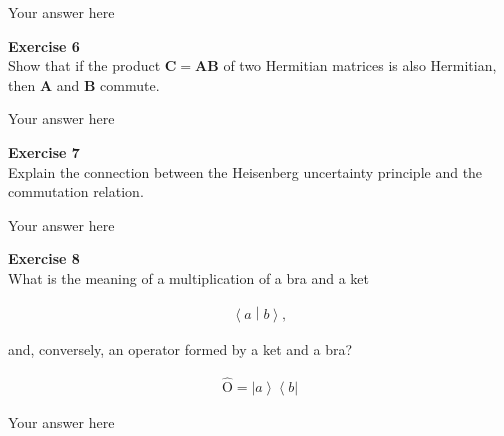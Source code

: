 \documentclass{article}
\begin{document}
Your answer here

\begin{mdframed}
\textbf{Exercise 6}\\
Show that if the product $\mathbf{C}=\mathbf{A}\mathbf{B}$ of two
Hermitian matrices is also Hermitian, then $\mathbf{A}$ and
$\mathbf{B}$ commute.
\end{mdframed}

Your answer here

\begin{mdframed}
\textbf{Exercise 7}\\
Explain the connection between the Heisenberg uncertainty principle and
the commutation relation.
\end{mdframed}

Your answer here

\begin{mdframed}
\textbf{Exercise 8}\\
What is the meaning of a multiplication of a bra and a ket

\begin{equation}
\begin{aligned}
     \left<a\middle|b\right>,
     \end{aligned}
\end{equation}

and, conversely, an operator formed by a ket and a bra?

\begin{equation}
\begin{aligned}
     \hat{\mathrm{O}} = \left|a\right>\left<b\right|
     \end{aligned}
\end{equation}
\end{mdframed}

Your answer here
\end{document}
